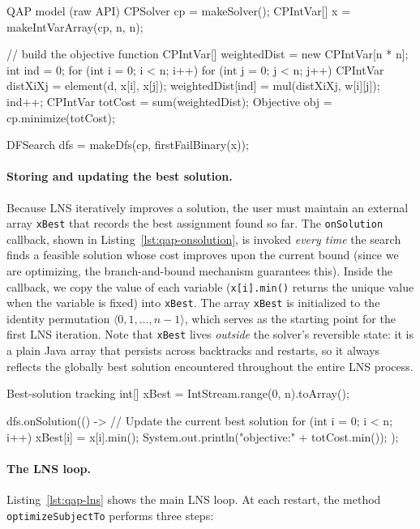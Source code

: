 \documentclass[11pt, a4paper]{scrartcl}
\begin{document}
\begin{codebox}[label={lst:qap-model}]{QAP model (raw API)}
CPSolver cp = makeSolver();
CPIntVar[] x = makeIntVarArray(cp, n, n);

// build the objective function
CPIntVar[] weightedDist = new CPIntVar[n * n];
int ind = 0;
for (int i = 0; i < n; i++) {
    for (int j = 0; j < n; j++) {
        CPIntVar distXiXj = element(d, x[i], x[j]);
        weightedDist[ind] = mul(distXiXj, w[i][j]);
        ind++;
    }
}
CPIntVar totCost = sum(weightedDist);
Objective obj = cp.minimize(totCost);

DFSearch dfs = makeDfs(cp, firstFailBinary(x));
\end{codebox}

\paragraph{Storing and updating the best solution.}
Because LNS iteratively improves a solution, the user must maintain an
external array \texttt{xBest} that records the best assignment found so
far.
The \texttt{onSolution} callback, shown in
Listing~\ref{lst:qap-onsolution}, is invoked \emph{every time} the
search finds a feasible solution whose cost improves upon the current bound (since we are optimizing, the branch-and-bound
mechanism guarantees this).
Inside the callback, we copy the value of each variable
(\texttt{x[i].min()} returns the unique value when the variable is
fixed) into \texttt{xBest}.
The array \texttt{xBest} is initialized to the identity permutation $\langle 0,1,\ldots,n{-}1\rangle$, which serves as the starting
point for the first LNS iteration.
Note that \texttt{xBest} lives \emph{outside} the solver's
reversible state: it is a plain Java array that persists across
backtracks and restarts, so it always reflects the globally best
solution encountered throughout the entire LNS process.

\begin{codebox}[label={lst:qap-onsolution}]{Best-solution tracking}
int[] xBest = IntStream.range(0, n).toArray();

dfs.onSolution(() -> {
    // Update the current best solution
    for (int i = 0; i < n; i++)
        xBest[i] = x[i].min();
    System.out.println("objective:" + totCost.min());
});
\end{codebox}

\paragraph{The LNS loop.}
Listing~\ref{lst:qap-lns} shows the main LNS loop.
At each restart, the method \texttt{optimizeSubjectTo} performs three
steps:
\end{document}
